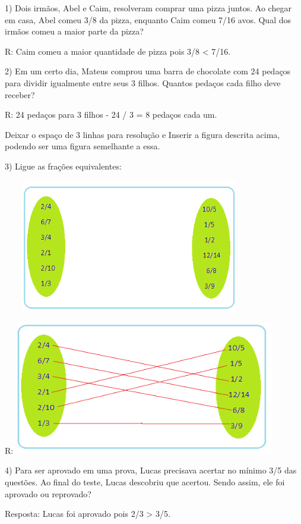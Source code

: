 
1) Dois irmãos, Abel e Caim, resolveram comprar uma pizza juntos. Ao
chegar em casa, Abel comeu 3/8 da pizza, enquanto Caim comeu 7/16 avos.
Qual dos irmãos comeu a maior parte da pizza?

R: Caim comeu a maior quantidade de pizza pois 3/8 \textless{} 7/16.

2) Em um certo dia, Mateus comprou uma barra de chocolate com 24 pedaços
para dividir igualmente entre seus 3 filhos. Quantos pedaços cada filho
deve receber?

R: 24 pedaços para 3 filhos - 24 / 3 = 8 pedaços cada um.

Deixar o espaço de 3 linhas para resolução e Inserir a figura descrita
acima, podendo ser uma figura semelhante a essa.

3) Ligue as frações equivalentes:

\includegraphics[width=4.35393in,height=2.301in]{./imgSAEB_6_MAT/media/image30.png}

R:
\includegraphics[width=4.5116in,height=2.28926in]{./imgSAEB_6_MAT/media/image31.png}

4) Para ser aprovado em uma prova, Lucas precisava acertar no mínimo 3/5
das questões. Ao final do teste, Lucas descobriu que acertou. Sendo
assim, ele foi aprovado ou reprovado?

Resposta: Lucas foi aprovado pois 2/3 \textgreater{} 3/5.

